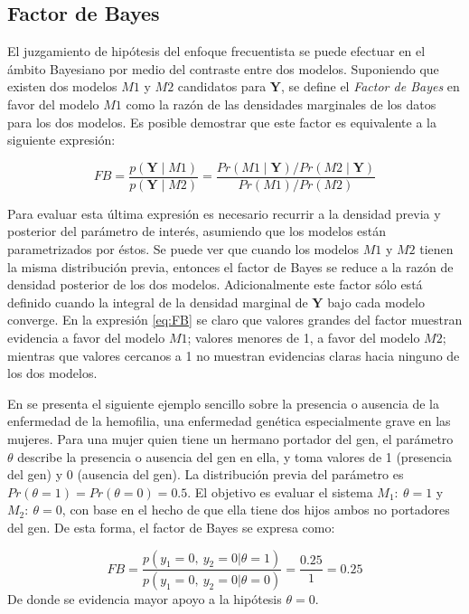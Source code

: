 \documentclass[
  10pt,
  spanish,
]{book}
\theoremstyle{definition}
\theoremstyle{definition}
\theoremstyle{definition}
\theoremstyle{definition}
\theoremstyle{remark}
\begin{document}
\hypertarget{factor-de-bayes}{%
\subsection{Factor de Bayes}\label{factor-de-bayes}}

El juzgamiento de hipótesis del enfoque frecuentista se puede efectuar
en el ámbito Bayesiano por medio del contraste entre dos modelos. Suponiendo
que existen dos modelos \(M1\) y \(M2\) candidatos para \(\mathbf{Y}\), se
define el \emph{Factor de Bayes} en favor del modelo \(M1\) como la razón
de las densidades marginales de los datos para los dos modelos. Es
posible demostrar que este factor es equivalente a la siguiente expresión:

\begin{equation}
\label{eq:FB}
FB=\frac{p(\mathbf{Y} \mid M1)}{p(\mathbf{Y} \mid M2)}=\frac{Pr(M1 \mid \mathbf{Y})/Pr(M2 \mid \mathbf{Y})}{Pr(M1)/Pr(M2)}
\end{equation}

Para evaluar esta última expresión es necesario recurrir a la densidad
previa y posterior del parámetro de interés, asumiendo que los modelos
están parametrizados por éstos. Se puede ver que cuando los modelos \(M1\)
y \(M2\) tienen la misma distribución previa, entonces el factor de Bayes
se reduce a la razón de densidad posterior de los dos modelos.
Adicionalmente este factor sólo está definido cuando la integral de la
densidad marginal de \(\mathbf{Y}\) bajo cada modelo converge. En la
expresión \eqref{eq:FB} se claro que valores grandes del factor muestran
evidencia a favor del modelo \(M1\); valores menores de 1, a favor del
modelo \(M2\); mientras que valores cercanos a 1 no muestran evidencias
claras hacia ninguno de los dos modelos.

En \citet{Gelman95} se presenta el siguiente ejemplo sencillo sobre la
presencia o ausencia de la enfermedad de la hemofilia, una enfermedad genética
especialmente grave en las mujeres. Para una mujer quien tiene un hermano
portador del gen, el parámetro \(\theta\) describe la presencia o ausencia
del gen en ella, y toma valores de 1 (presencia del gen) y 0 (ausencia
del gen). La distribución previa del parámetro es
\(Pr(\theta=1)=Pr(\theta=0)=0.5\). El objetivo es evaluar el sistema
\(M_1:\ \theta=1\) y \(M_2:\ \theta=0\), con base en el hecho de que ella
tiene dos hijos ambos no portadores del gen. De esta forma, el factor de Bayes se expresa como:

\begin{equation*}
FB=\frac{p(y_1=0,\ y_2=0|\theta=1)}{p(y_1=0,\ y_2=0|\theta=0)}=\frac{0.25}{1}=0.25
\end{equation*} De donde se evidencia mayor apoyo a la hipótesis
\(\theta=0\).
\end{document}
